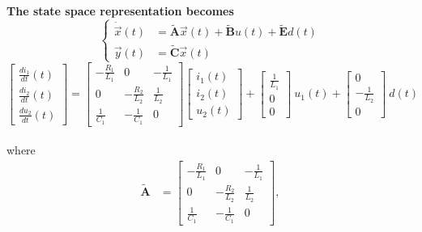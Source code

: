 \documentclass[12pt,a4paper,oneside]{book}
\begin{document}
\begin{onehalfspace}
\begin{mybox}
	\noindent\textbf{The state space representation becomes}
	\begin{equation*}
		\left\lbrace \begin{aligned}
			\dot{\vec{x}}(t) &= \tilde{\mathbf{A}} \vec{x}(t) + 
			\tilde{\mathbf{B}}u(t) + \tilde{\mathbf{E}}d(t)\\[6pt]
			{\vec{y}}(t) &= \tilde{\mathbf{C}} \vec{x}(t)
		\end{aligned}\right. 
	\end{equation*}
	\begin{equation*}
		\left[ 
		\begin{matrix}
			\frac{di_1}{dt}(t) \\[6pt]
			\frac{di_2}{dt}(t) \\[6pt]
			\frac{du_2}{dt}(t)
		\end{matrix} \right] = \left[ 
		\begin{matrix}
			-\frac{R_1}{L_1} & 0 & -\frac{1}{L_1}\\[6pt]
			0 & -\frac{R_2}{L_2} & \frac{1}{L_2}\\[6pt]
			\frac{1}{C_1} & -\frac{1}{C_1} & 0
		\end{matrix} \right] \left[ 
		\begin{matrix}
			i_1(t) \\[6pt]
			i_2(t)\\[6pt]
			u_2(t)
		\end{matrix} \right] + 
		\left[ 
		\begin{matrix}
			\frac{1}{L_1} \\[6pt]
			0 \\[6pt]
			0
		\end{matrix} \right] \ u_1(t) + 
		\left[ 
		\begin{matrix}
			0 \\[6pt]
			-\frac{1}{L_2} \\[6pt]
			0
		\end{matrix} \right] \ d(t)
	\end{equation*}\\
	where 
	\begin{equation*}
		\begin{aligned}
			\tilde{\mathbf{A}} &= \begin{bmatrix}
				-\frac{R_1}{L_1} & 0 & -\frac{1}{L_1}\\[6pt]
				0 & -\frac{R_2}{L_2} & \frac{1}{L_2}\\[6pt]
				\frac{1}{C_1} & -\frac{1}{C_1} & 0
			\end{bmatrix}, 

\end{aligned}
\end{equation*}
\end{mybox}
\end{onehalfspace}
\end{document}
